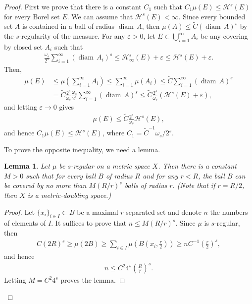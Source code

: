 \documentclass[11pt]{book}
\newtheorem{lemma}{Lemma}[chapter]
\theoremstyle{definition}
\numberwithin{equation}{chapter}
\def\H{{\mathcal H}}
\def\diam{{\operatorname{diam}\,}}
\begin{document}
\begin{proof}
First we prove that there is a constant $C_1$ such that $C_1 \mu(E) \leq \H^s(E)$ for every Borel set $E$. We can assume that $\H^s(E) < \infty$. Since every bounded set $A$ is contained in a ball of radius $\diam A$, then $\mu(A) \leq 
\widetilde{C} (\diam A)^s$ by the $s$-regularity of the measure. For any $\varepsilon > 0$, let $E \subset \bigcup^\infty_{i=1} A_i$ be any covering by closed set $A_i$ such that 
\begin{align*}
    \frac{\omega_s}{2^s} \sum^\infty_{i=1} (\diam A_i)^s \leq \H^s_\infty(E) + \varepsilon \leq \H^s(E) + \varepsilon.
\end{align*}
Then,
\begin{align*}
    \mu(E) & \leq \mu \left(\sum^\infty_{i=1} A_i\right) \leq \sum^\infty_{i=1} \mu(A_i) \leq \widetilde{C} \sum^\infty_{i=1} (\diam A)^s \\
    & = \widetilde{C} \frac{2^s}{\omega_s} \frac{\omega_s}{2^s} \sum^\infty_{i=1} (\diam A)^s \leq \widetilde{C} \frac{2^s}{\omega_s} (\H^s(E) + \varepsilon),
\end{align*}
and letting $\varepsilon \to 0$ gives
\begin{align*}
    \mu(E) \leq \widetilde{C} \frac{2^s}{\omega_s} \H^s(E),
\end{align*}
and hence $C_1 \mu(E) \leq \H^s(E)$, where $C_1 = \widetilde{C}^{-1} \omega_s/2^s$.

\medskip

To prove the opposite inequality, we need a lemma.

\medskip

\begin{lemma}\label{lemma_51}
Let $\mu$ be $s$-regular on a metric space $X$. Then there is a constant $M > 0$ such that for every ball $B$ of radius $R$ and for any $r < R$, the ball $B$ can be covered by no more than $M(R/r)^s$ balls of radius $r$. (Note that if $r = R/2$, then $X$ is a metric-doubling space.)
\end{lemma}
\begin{proof}
Let $\{x_i\}_{i \in I} \subset B$ be a maximal $r$-separated set and denote $n$ the numbers of elements of $I$. It suffices to prove that $n \leq M(R/r)^s$. Since $\mu$ is $s$-regular, then
\begin{align*}
    C(2R)^s \geq \mu(2B) \geq \sum_{i\in I} \mu\left(B\left(x_i, \frac{r}{2}\right)\right) \geq n C^{-1} \left(\frac{r}{2}\right)^s,
\end{align*}
and hence
\begin{align*}
    n \leq C^2 4^s \left(\frac{R}{r}\right)^s.
\end{align*}
Letting $M = C^2 4^s$ proves the lemma.
\end{proof}


\end{proof}
\end{document}

